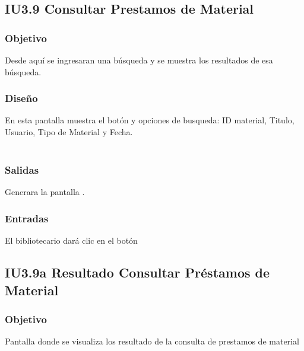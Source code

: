 \newpage
\subsection{IU3.9 Consultar Prestamos de Material}

\subsubsection{Objetivo}
	Desde aquí se ingresaran una búsqueda y se muestra los resultados de esa búsqueda.

\subsubsection{Diseño}
	En esta pantalla muestra el botón  y opciones de busqueda: ID material, Titulo, Usuario, Tipo de Material y Fecha.  \\\\


\subsubsection{Salidas}
	\begin{Citemize}
		\item Generara la pantalla . 
	\end{Citemize}
	
\subsubsection{Entradas}
	\begin{Citemize}
		\item El bibliotecario dará clic en el botón \IUbutton{Buscar}
	\end{Citemize}




\subsection{IU3.9a Resultado Consultar Préstamos de Material}

\subsubsection{Objetivo}
	Pantalla donde se visualiza los resultado de la consulta de prestamos de material

